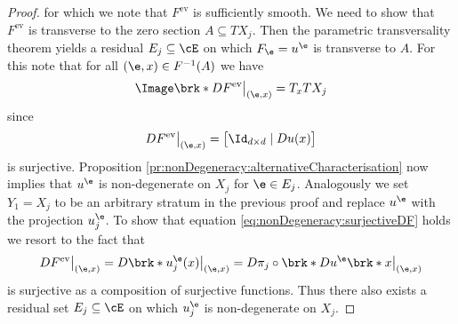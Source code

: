 \begin{proof}
  for which we note that $F^\text{ev}$ is sufficiently smooth. 
  We need to show that $F^\text{ev}$ is transverse to the
  zero section $A\subseteq TX_j$. Then the parametric transversality theorem 
  yields a residual $E_j\subseteq \cE$ on which
  $F_\e=u^\e$ is transverse to $A$.
  For this note that for all $(\e,x)\in F^{-1}(A)$ we have
  \begin{align}
    \Image\brk*{DF^\text{ev}\big\vert_{(\e,x)}}=T_xTX_j\label{eq:nonDegeneracy:surjectiveDF}
  \end{align}
  since
  \begin{align*}
    DF^\text{ev}\big\vert_{(\e,x)}=\begin{bmatrix}
      \Id_{d\times d}\mid Du(x)
    \end{bmatrix}
  \end{align*}
  is surjective. 
  Proposition \ref{pr:nonDegeneracy:alternativeCharacterisation}
  now implies that $u^\e$ is non-degenerate on $X_j$ for $\e\in E_j$.
  Analogously we set $Y_1=X_j$ to be an arbitrary stratum in the previous proof and replace
  $u^\e$ with the projection $u_j^\e$. To show that
  equation \eqref{eq:nonDegeneracy:surjectiveDF} holds we resort to the fact that
  \begin{align*}
    DF^\text{ev}\big\vert_{(\e,x)}
    =D\brk*{u_j^\e(x)}\big\vert_{(\e,x)}
    =D\pi_j\circ \brk*{Du^\e\brk*{x}}\big\vert_{(\e,x)}
  \end{align*}
  is surjective as a composition of surjective functions.
  Thus there also exists a residual set $E_j\subseteq\cE$ on which $u^\e_j$ is
  non-degenerate on $X_j$.

\end{proof}
